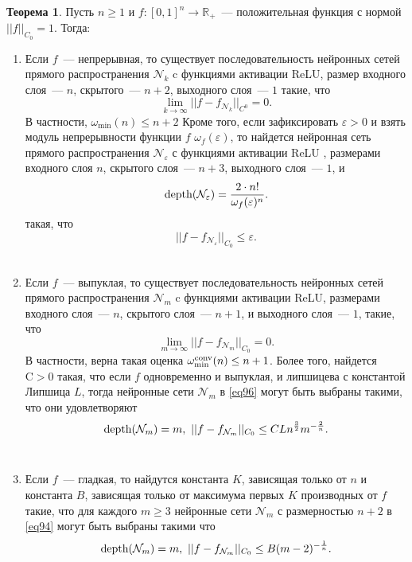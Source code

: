 \documentclass[12pt, twoside]{article}
\theoremstyle{definition}
\newtheorem*{theorem*}{Теорема}
\begin{document}
\begin{theorem*} Пусть $n \geq 1$ и $f: [0,1]^n \rightarrow \mathbb{R}_+$~--- положительная функция с нормой $||f||_{C_0} = 1$. Тогда: 
\begin{enumerate}
    \item Если $f$~--- непрерывная, то существует последовательность нейронных сетей прямого распространения $\mathcal{N}_k$ c функциями активации ReLU, размер входного слоя~--- $n$, скрытого~--- $n+2$, выходного слоя~--- $1$ такие, что 
    \begin{equation}\label{eq94}
        \underset{k \rightarrow \infty}\lim||f - f_{\mathcal{N}_k}||_{C^0} = 0.
    \end{equation}
    В частности, $\omega_{\min}(n) \leq n + 2$ Кроме того, если зафиксировать $\varepsilon > 0$ и взять модуль непрерывности функции $f$ $\omega_f(\varepsilon)$, то найдется нейронная сеть прямого распространения $\mathcal{N}_{\varepsilon}$ с функциями активации ReLU , размерами входного слоя $n$, скрытого слоя~--- $n+3$, выходного слоя~--- $1$, и 
    \begin{equation}\label{eq95}
        \textnormal{depth}(\mathcal{N}_{\varepsilon}) = \frac{2 \cdot n!}{\omega_f(\varepsilon)^n}.
    \end{equation}
    такая, что \begin{equation}
        ||f - f_{\mathcal{N}_{\varepsilon}}||_{C_0} \leq \varepsilon.
    \end{equation} \\
    \item Если $f$~--- выпуклая, то существует последовательность нейронных сетей прямого распространения  $\mathcal{N}_{m}$ c функциями активации ReLU, размерами входного слоя~--- $n$, скрытого слоя~--- $n+1$, и выходного слоя~--- $1$, такие, что 
    \begin{equation}\label{eq96}
        \underset{m \rightarrow \infty}\lim||f - f_{\mathcal{N}_m}||_{C_0} = 0.
    \end{equation}
    В частности, верна такая оценка $\omega_{\min}^{\textnormal{conv}}(n) \leq n + 1$. Более того, найдется~$\mbox{C} > 0$ такая, что если $f$ одновременно и выпуклая, и липшицева с константой Липшица $L$, тогда нейронные сети $\mathcal{N}_m$ в \eqref{eq96} могут быть выбраны такими, что они удовлетворяют
    \begin{equation}
        \textnormal{depth} (\mathcal{N}_m) = m,\  ||f - f_{\mathcal{N}_m}||_{C_0} \leq CLn^{\frac{3}{2}}m^{-\frac{2}{n}}.
    \end{equation} \\
    \item Если $f$~--- гладкая, то найдутся константа $K$, зависящая только от $n$ и константа $B$, зависящая только от максимума первых $K$ производных от $f$ такие, что для каждого $m \geq 3$ нейронные сети $\mathcal{N}_m$ с размерностью $n + 2$ в \eqref{eq94} могут быть выбраны такими что 
    \begin{equation}
        \textnormal{depth}(\mathcal{N}_m) = m,\ ||f - f_{\mathcal{N}_m}||_{C_0} \leq B(m - 2)^{-\frac{1}{n}}.
    \end{equation} \\
\end{enumerate}


\end{theorem*}
\end{document}
